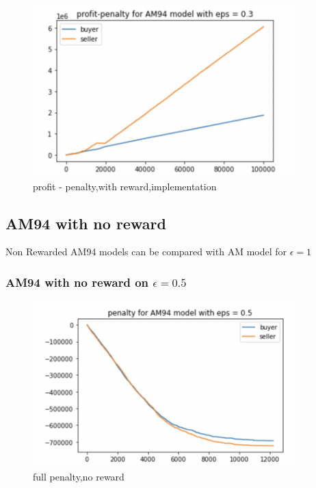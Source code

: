 \documentclass[11pt]{article}
\begin{document}
\begin{figure}[H]
	\begin{center}
	\includegraphics[width=0.9\textwidth]{18.PNG}
	\end{center}
	\caption{profit - penalty,with reward,implementation}
	\label{FIG.18}
\end{figure}


\subsection{AM94 with no reward}
Non Rewarded AM94 models can be compared with AM model for $\epsilon = 1$
\subsubsection{AM94 with no reward on $\epsilon = 0.5$}

\begin{figure}[H]
	\begin{center}
	\includegraphics[width=0.9\textwidth]{19.PNG}
	\end{center}
	\caption{full penalty,no reward}
	\label{FIG.19}
\end{figure}
\end{document}
